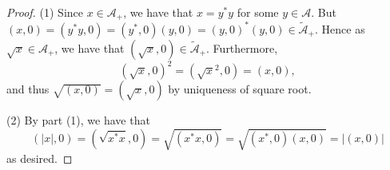 \documentclass[10pt,a4paper]{amsart}
\newcommand{\A}{{\mathcal{A}}}
\newcommand{\wt}[1]{{\widetilde{#1}}}
\begin{document}
\begin{proof}
    (1) Since $x\in \A_+$, we have that $x=y^*y$ for some $y\in \A$. But $(x,0)=(y^*y,0)=(y^*,0)(y,0)=(y,0)^*(y,0)\in \wt{\A}_+$. Hence as $\sqrt{x}\in \A_+$, we have that $(\sqrt{x},0)\in \wt{\A}_+$. Furthermore, 
    \[
    (\sqrt{x},0)^2=(\sqrt{x}^2,0)=(x,0),
    \]
    and thus $\sqrt{(x,0)}=(\sqrt{x},0)$ by uniqueness of square root.

    (2) By part (1), we have that 
    \[
    (|x|, 0)=\left( \sqrt{x^*x},0\right)=\sqrt{(x^*x, 0)}=\sqrt{(x^*,0)(x,0)}=|(x,0)|
    \]
    as desired.
\end{proof}
\end{document}
